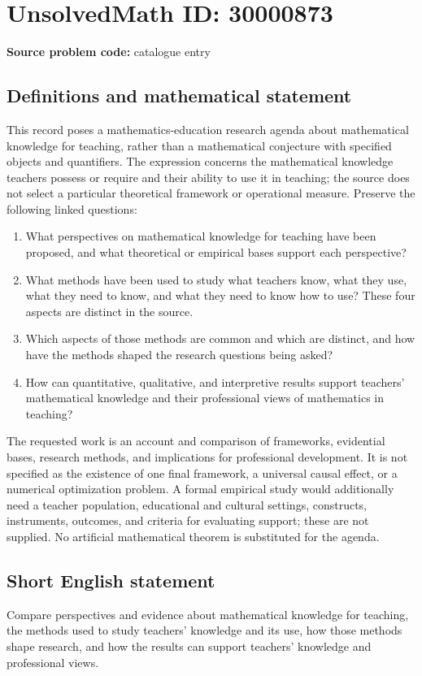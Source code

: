 \documentclass[11pt]{article}
\begin{document}
\section*{UnsolvedMath ID: 30000873}
\textbf{Source problem code:} catalogue entry
\subsection{Definitions and mathematical statement}
This record poses a mathematics-education research agenda about mathematical knowledge for teaching, rather than a mathematical conjecture with specified objects and quantifiers. The expression concerns the mathematical knowledge teachers possess or require and their ability to use it in teaching; the source does not select a particular theoretical framework or operational measure. Preserve the following linked questions:
\begin{enumerate}
\item What perspectives on mathematical knowledge for teaching have been proposed, and what theoretical or empirical bases support each perspective?
\item What methods have been used to study what teachers know, what they use, what they need to know, and what they need to know how to use? These four aspects are distinct in the source.
\item Which aspects of those methods are common and which are distinct, and how have the methods shaped the research questions being asked?
\item How can quantitative, qualitative, and interpretive results support teachers' mathematical knowledge and their professional views of mathematics in teaching?
\end{enumerate}
The requested work is an account and comparison of frameworks, evidential bases, research methods, and implications for professional development. It is not specified as the existence of one final framework, a universal causal effect, or a numerical optimization problem. A formal empirical study would additionally need a teacher population, educational and cultural settings, constructs, instruments, outcomes, and criteria for evaluating support; these are not supplied. No artificial mathematical theorem is substituted for the agenda.
\subsection{Short English statement}
Compare perspectives and evidence about mathematical knowledge for teaching, the methods used to study teachers' knowledge and its use, how those methods shape research, and how the results can support teachers' knowledge and professional views.
\end{document}
